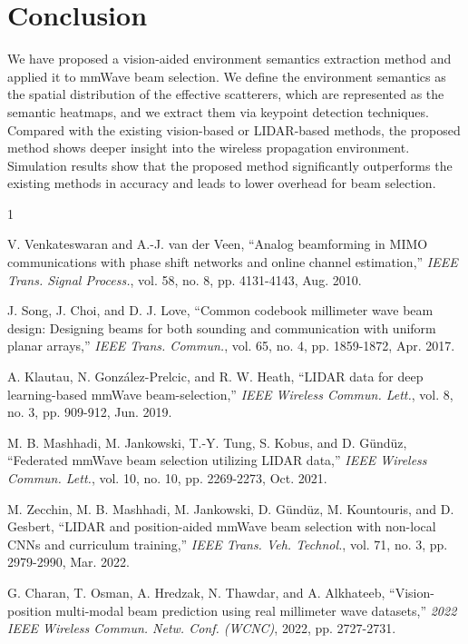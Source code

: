 \documentclass[lettersize,journal]{IEEEtran}
\begin{document}
\section{Conclusion}
We have proposed a vision-aided environment semantics extraction method and applied it to mmWave beam selection. We define the environment semantics as the spatial distribution of the effective scatterers, which are represented as the semantic heatmaps, and we extract them via keypoint detection techniques.
Compared with the existing vision-based or LIDAR-based methods, the proposed method shows deeper insight into the wireless propagation environment.
Simulation results show that the proposed method significantly outperforms the existing methods in accuracy and leads to lower overhead for beam selection.


\begin{thebibliography}{1}


V. Venkateswaran and A.-J. van der Veen, ``Analog beamforming in MIMO communications with phase shift networks and online channel estimation,'' \textit{IEEE Trans. Signal Process.}, vol. 58, no. 8, pp. 4131-4143, Aug. 2010.

J. Song, J. Choi, and D. J. Love, ``Common codebook millimeter wave beam design: Designing beams for both sounding and communication with uniform planar arrays,'' \textit{IEEE Trans. Commun.}, vol. 65, no. 4, pp. 1859-1872, Apr. 2017.

A. Klautau, N. González-Prelcic, and R. W. Heath, ``LIDAR data for deep learning-based mmWave beam-selection,'' \textit{IEEE Wireless Commun. Lett.}, vol. 8, no. 3, pp. 909-912, Jun. 2019.

M. B. Mashhadi, M. Jankowski, T.-Y. Tung, S. Kobus, and D. Gündüz, ``Federated mmWave beam selection utilizing LIDAR data,'' \textit{IEEE Wireless Commun. Lett.}, vol. 10, no. 10, pp. 2269-2273, Oct. 2021.

M. Zecchin, M. B. Mashhadi, M. Jankowski, D. Gündüz, M. Kountouris, and D. Gesbert, ``LIDAR and position-aided mmWave beam selection with non-local CNNs and curriculum training,'' \textit{IEEE Trans. Veh. Technol.}, vol. 71, no. 3, pp. 2979-2990, Mar. 2022.

G. Charan, T. Osman, A. Hredzak, N. Thawdar, and A. Alkhateeb, ``Vision-position multi-modal beam prediction using real millimeter wave datasets,'' \textit{2022 IEEE Wireless Commun. Netw. Conf. (WCNC)}, 2022, pp. 2727-2731.


\end{thebibliography}
\end{document}
